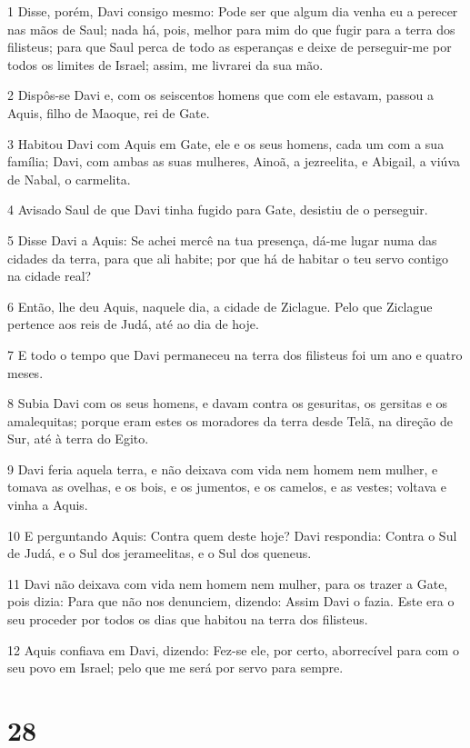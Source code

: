 \par 1 Disse, porém, Davi consigo mesmo: Pode ser que algum dia venha eu a perecer nas mãos de Saul; nada há, pois, melhor para mim do que fugir para a terra dos filisteus; para que Saul perca de todo as esperanças e deixe de perseguir-me por todos os limites de Israel; assim, me livrarei da sua mão.
\par 2 Dispôs-se Davi e, com os seiscentos homens que com ele estavam, passou a Aquis, filho de Maoque, rei de Gate.
\par 3 Habitou Davi com Aquis em Gate, ele e os seus homens, cada um com a sua família; Davi, com ambas as suas mulheres, Ainoã, a jezreelita, e Abigail, a viúva de Nabal, o carmelita.
\par 4 Avisado Saul de que Davi tinha fugido para Gate, desistiu de o perseguir.
\par 5 Disse Davi a Aquis: Se achei mercê na tua presença, dá-me lugar numa das cidades da terra, para que ali habite; por que há de habitar o teu servo contigo na cidade real?
\par 6 Então, lhe deu Aquis, naquele dia, a cidade de Ziclague. Pelo que Ziclague pertence aos reis de Judá, até ao dia de hoje.
\par 7 E todo o tempo que Davi permaneceu na terra dos filisteus foi um ano e quatro meses.
\par 8 Subia Davi com os seus homens, e davam contra os gesuritas, os gersitas e os amalequitas; porque eram estes os moradores da terra desde Telã, na direção de Sur, até à terra do Egito.
\par 9 Davi feria aquela terra, e não deixava com vida nem homem nem mulher, e tomava as ovelhas, e os bois, e os jumentos, e os camelos, e as vestes; voltava e vinha a Aquis.
\par 10 E perguntando Aquis: Contra quem deste hoje? Davi respondia: Contra o Sul de Judá, e o Sul dos jerameelitas, e o Sul dos queneus.
\par 11 Davi não deixava com vida nem homem nem mulher, para os trazer a Gate, pois dizia: Para que não nos denunciem, dizendo: Assim Davi o fazia. Este era o seu proceder por todos os dias que habitou na terra dos filisteus.
\par 12 Aquis confiava em Davi, dizendo: Fez-se ele, por certo, aborrecível para com o seu povo em Israel; pelo que me será por servo para sempre.

\chapter{28}

